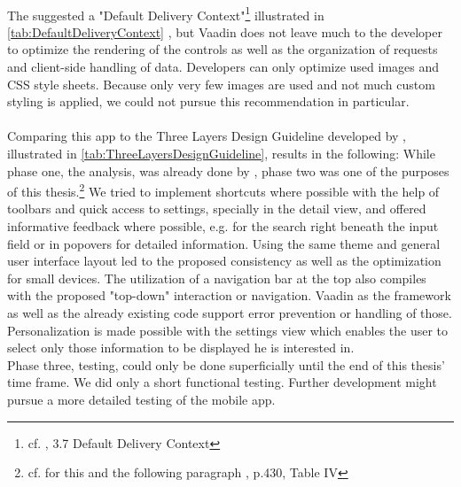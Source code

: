 \\
The \cite{WorldWideWebConsortium.2008} suggested a "Default Delivery Context"\footnote{cf. \cite{WorldHealthOrganization.2011}, 3.7 Default Delivery Context} illustrated in \ref{tab:DefaultDeliveryContext} , but Vaadin does not leave much to the developer to optimize the rendering of the controls as well as the organization of requests and client-side handling of data. Developers can only optimize used images and CSS style sheets. Because only very few images are used and not much custom styling is applied, we could not pursue this recommendation in particular.
\\
\\
Comparing this app to the Three Layers Design Guideline developed by \cite{AyobNurulZakiahbinti.2009}, illustrated in \ref{tab:ThreeLayersDesignGuideline}, results in the following: While phase one, the analysis, was already done by \cite{Dehling.2012}, phase two was one of the purposes of this thesis.\footnote{cf. for this and the following paragraph \cite{AyobNurulZakiahbinti.2009}, p.430, Table IV} We tried to implement shortcuts where possible with the help of toolbars and quick access to settings, specially in the detail view, and offered informative feedback where possible, e.g. for the search right beneath the input field or in popovers for detailed information. Using the same theme and general user interface layout led to the proposed consistency as well as the optimization for small devices. The utilization of a navigation bar at the top also compiles with the proposed "top-down" interaction or navigation. Vaadin as the framework as well as the already existing code support error prevention or handling of those. Personalization is made possible with the settings view which enables the user to select only those information to be displayed he is interested in.
\\
Phase three, testing, could only be done superficially until the end of this thesis' time frame. We did only a short functional testing. Further development might pursue a more detailed testing of the mobile app.
\\
